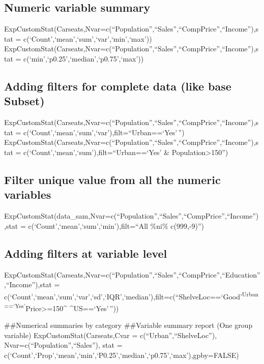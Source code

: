 \documentclass[]{article}
\begin{document}
\hypertarget{numeric-variable-summary}{%
\subsection{Numeric variable summary}\label{numeric-variable-summary}}

ExpCustomStat(Carseats,Nvar=c(``Population'',``Sales'',``CompPrice'',``Income''),stat
= c(`Count',`mean',`sum',`var',`min',`max'))
ExpCustomStat(Carseats,Nvar=c(``Population'',``Sales'',``CompPrice'',``Income''),stat
= c(`min',`p0.25',`median',`p0.75',`max'))

\hypertarget{adding-filters-for-complete-data-like-base-subset}{%
\subsection{Adding filters for complete data (like base
Subset)}\label{adding-filters-for-complete-data-like-base-subset}}

ExpCustomStat(Carseats,Nvar=c(``Population'',``Sales'',``CompPrice'',``Income''),stat
= c(`Count',`mean',`sum',`var'),filt=``Urban==`Yes'\,'')
ExpCustomStat(Carseats,Nvar=c(``Population'',``Sales'',``CompPrice'',``Income''),stat
= c(`Count',`mean',`sum'),filt=``Urban==`Yes' \&
Population\textgreater150'')

\hypertarget{filter-unique-value-from-all-the-numeric-variables}{%
\subsection{Filter unique value from all the numeric
variables}\label{filter-unique-value-from-all-the-numeric-variables}}

ExpCustomStat(data\_sam,Nvar=c(``Population'',``Sales'',``CompPrice'',``Income''),stat
= c(`Count',`mean',`sum',`min'),filt=``All \%ni\% c(999,-9)'')

\hypertarget{adding-filters-at-variable-level}{%
\subsection{Adding filters at variable
level}\label{adding-filters-at-variable-level}}

ExpCustomStat(Carseats,Nvar=c(``Population'',``Sales'',``CompPrice'',``Education'',``Income''),stat
=
c(`Count',`mean',`sum',`var',`sd',`IQR',`median'),filt=c(``ShelveLoc==`Good'\textsuperscript{Urban==`Yes'}Price\textgreater=150\^{}
\^{}US==`Yes'\,''))

\#\#Numerical summaries by category \#\#Variable summary report (One
group variable) ExpCustomStat(Carseats,Cvar =
c(``Urban'',``ShelveLoc''), Nvar=c(``Population'',``Sales''), stat =
c(`Count',`Prop',`mean',`min',`P0.25',`median',`p0.75',`max'),gpby=FALSE)
\end{document}
